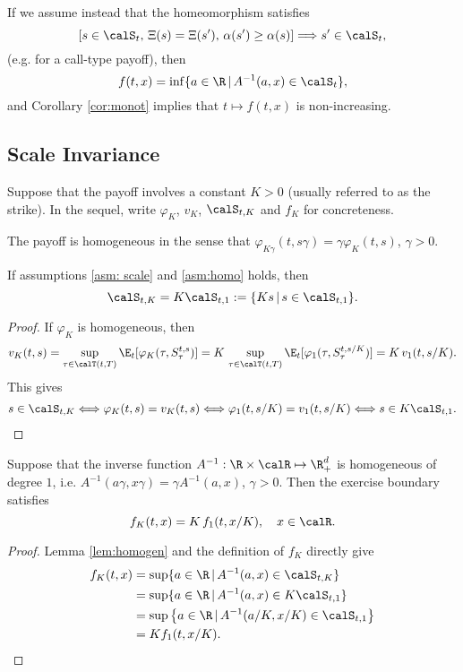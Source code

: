 \begin{remark}
If we  assume instead that the homeomorphism satisfies
$$\left [ s\in \calS_t,\,  \Xi(s)=\Xi(s'), \,  \alpha(s')\geq \alpha(s) \right]  \Longrightarrow s'\in \calS_t,$$ (e.g. for a call-type payoff), then 
$$f(t,x)= \inf \{a \in \R \, |\, A^{-1}(a,x) \in \calS_t\},$$
and Corollary \ref{cor:monot} implies  that $t\mapsto f(t,x)$ is non-increasing.

\end{remark}
\subsection{Scale Invariance}

Suppose that the payoff involves a constant $K>0$ (usually referred to as the strike). In the sequel, write $\varphi_K$, $v_K$, $\calS_{t,K}$ and $f_K$ for concreteness.
\begin{asm} \label{asm:homo}
The payoff
 is homogeneous in the  sense that $\varphi_{K\gamma}(t,s\gamma )=\gamma \varphi_{K}(t,s)$, $ \gamma>0$. 
\end{asm}

\begin{lemma}\label{lem:homogen}
If assumptions \ref{asm: scale} and \ref{asm:homo} holds,
then 
$$\calS_{t,K}=K\calS_{t,1}:= \{Ks \,|\, s \in \calS_{t,1}\}.$$
\end{lemma}
\begin{proof}
If $\varphi_K$ is homogeneous, then 
$$v_K(t,s) = \sup_{\tau \in \calT(t,T)} \E_t[\varphi_K(\tau,S^{t,s}_{\tau})] = K \,\sup_{\tau \in \calT(t,T)} \E_t[\varphi_1(\tau,S^{t,s/K}_{\tau})]=K\, v_1(t,s/K).$$
This gives
\begin{align*}
    s \in \calS_{t,K} \Longleftrightarrow \varphi_K(t,s) = v_K(t,s)
    \Longleftrightarrow \varphi_1(t,s/K) = v_1(t,s/K)
    \Longleftrightarrow s \in K\calS_{t,1}.
\end{align*}
\end{proof}

\begin{corollary}
Suppose that the inverse function $A^{-1}: \R \times \calR \mapsto \R_+^d$ is homogeneous of degree $1$, i.e. $A^{-1}(a\gamma,x\gamma) = \gamma A^{-1}(a,x)$, $\gamma>0$. Then the exercise boundary satisfies
$$f_K(t,x)= K \, f_1(t,x/K), \quad x \in \calR.$$
\end{corollary}

\begin{proof}
Lemma \ref{lem:homogen} and the definition of $f_K$ directly give
\begin{align*}
    f_K(t,x) &= \sup \{a \in \R \,|\, A^{-1}(a,x) \in \calS_{t,K} \}\\
&= \sup \{a \in \R \,|\, A^{-1}(a,x) \in K\calS_{t,1} \}\\
&= \sup \left \{a \in \R \,|\, A^{-1}(a/K,x/K) \in \calS_{t,1}\right \}\\
&= K f_1(t,x/K).
\end{align*}

\end{proof}

